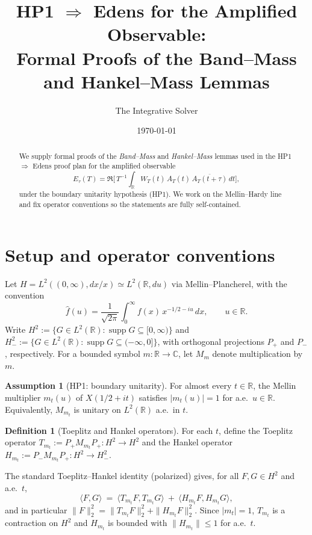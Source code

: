 \documentclass[11pt]{article}
\title{HP1 $\Rightarrow$ Edens for the Amplified Observable:\\
Formal Proofs of the Band--Mass and Hankel--Mass Lemmas}
\author{The Integrative Solver}
\date{\today}
\theoremstyle{plain}
\theoremstyle{definition}
\newtheorem{definition}[theorem]{Definition}
\newtheorem{assumption}[theorem]{Assumption}
\numberwithin{equation}{section}
\begin{document}
\maketitle

\begin{abstract}
We supply formal proofs of the \emph{Band--Mass} and \emph{Hankel--Mass} lemmas used in the HP1 $\Rightarrow$ Edens proof plan for the amplified observable
\[
E_\tau(T)=\Re\bigg[\,T^{-1}\!\int_{\mathbb R} W_T(t)\,A_T(t)\,\overline{A_T(t+\tau)}\,dt\bigg],
\]
under the boundary unitarity hypothesis (HP1). We work on the Mellin--Hardy line and fix operator conventions so the statements are fully self-contained.
\end{abstract}

\section{Setup and operator conventions}

Let $H=L^2((0,\infty),dx/x)\simeq L^2(\mathbb R,du)$ via Mellin--Plancherel, with the convention
\[
\widehat{f}(u)=\frac{1}{\sqrt{2\pi}}\int_0^\infty f(x)\,x^{-1/2-iu}\,dx,\qquad u\in\mathbb R.
\]
Write $H^2:=\{G\in L^2(\mathbb R):\operatorname{supp}G\subseteq[0,\infty)\}$ and $H^2_-:=\{G\in L^2(\mathbb R):\operatorname{supp}G\subseteq(-\infty,0]\}$,
with orthogonal projections $P_+$ and $P_-$, respectively. For a bounded symbol $m:\mathbb R\to\mathbb C$, let $M_m$ denote multiplication by $m$.

\begin{assumption}[HP1: boundary unitarity]
For almost every $t\in\mathbb R$, the Mellin multiplier $m_t(u)$ of $X(1/2+it)$ satisfies $|m_t(u)|=1$ for a.e.\ $u\in\mathbb R$. Equivalently, $M_{m_t}$ is unitary on $L^2(\mathbb R)$ a.e.\ in $t$.
\end{assumption}

\begin{definition}[Toeplitz and Hankel operators]
For each $t$, define the Toeplitz operator $T_{m_t}:=P_+M_{m_t}P_+:H^2\to H^2$
and the Hankel operator $H_{m_t}:=P_-M_{m_t}P_+:H^2\to H^2_-$.
\end{definition}

The standard Toeplitz--Hankel identity (polarized) gives, for all $F,G\in H^2$ and a.e.\ $t$,
\begin{equation}\label{eq:polar}
\langle F,G\rangle \ =\ \langle T_{m_t}F,T_{m_t}G\rangle \ +\ \langle H_{m_t}F,H_{m_t}G\rangle,
\end{equation}
and in particular $\|F\|_2^2=\|T_{m_t}F\|_2^2+\|H_{m_t}F\|_2^2$.
Since $|m_t|=1$, $T_{m_t}$ is a contraction on $H^2$ and $H_{m_t}$ is bounded with $\|H_{m_t}\|\le 1$ for a.e.\ $t$.
\end{document}
